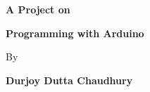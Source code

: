 \documentclass[a4paper, 12pt, titlepage, oneside]{article}
\begin{document}


\begin{titlepage}
\begin{titlepage}
   \begin{center}
        \vspace*{2cm} %
        \Large{\textbf{A Project on}}
        
        \vspace{0.1cm}        
        \Huge{\textbf{Programming with Arduino}} 
               
        \vspace{5 cm}
        \Large{By}        
       
        \vspace{5cm}
        \large{\textbf{Durjoy Dutta Chaudhury}}        

       \vfill
    \end{center}
\end{titlepage}
\end{titlepage}

\pagebreak\tableofcontents
\pagebreak


    
    
        
     
     
     
    
\end{document}
